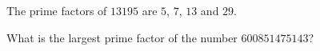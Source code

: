 
\begin{ProjectEuler}{3}
The prime factors of $13195$ are $5$, $7$, $13$ and $29$. \medskip

\noindent What is the largest prime factor of the number $600851475143$?
\end{ProjectEuler}
